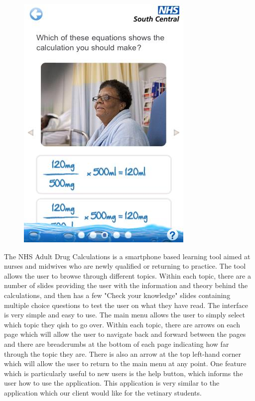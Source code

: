 \documentclass{l3proj}
\begin{document}
\begin{figure}[!htb]
  \includegraphics[width=\linewidth]{images/NHSDrugApp/NHSDrugApp4.png}
\endminipage
\end{figure}


The NHS Adult Drug Calculations is a smartphone based learning tool aimed at nurses and midwives who are newly qualified or returning to practice. The tool allows the user to browse through different topics. Within each topic, there are a number of slides providing the user with the information and theory behind the calculations, and then has a few "Check your knowledge" slides containing multiple choice questions to test the user on what they have read. The interface is very simple and easy to use. The main menu allows the user to simply select which topic they qish to go over. Within each topic, there are arrows on each page which will allow the user to navigate back and forward between the pages and there are breadcrumbs at the bottom of each page indicating how far through the topic they are.  There is also an arrow at the top left-hand corner which will allow the user to return to the main menu at any point. One feature which is particularly useful to new users is the help button, which informs the user how to use the application. This application is very similar to the application which our client would like for the vetinary students.
\end{document}

